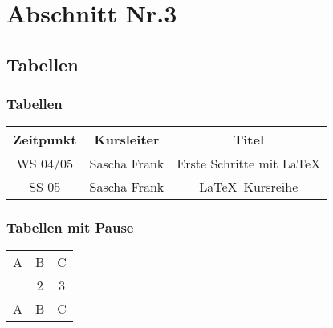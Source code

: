 \documentclass{beamer}
\begin{document}

\section{Abschnitt Nr.3} 
\subsection{Tabellen}
\begin{frame}\frametitle{Tabellen}
\begin{tabular}{|c|c|c|}
\hline
\textbf{Zeitpunkt} & \textbf{Kursleiter} & \textbf{Titel} \\
\hline
WS 04/05 & Sascha Frank &  Erste Schritte mit \LaTeX  \\
\hline
SS 05 & Sascha Frank & \LaTeX \ Kursreihe \\
\hline
\end{tabular}
\end{frame}


\begin{frame}\frametitle{Tabellen mit Pause}
\begin{tabular}{c c c}
A & B & C \\ 
\pause 
1 & 2 & 3 \\  
\pause 
A & B & C \\ 
\end{tabular} 
\end{frame}
\end{document}

